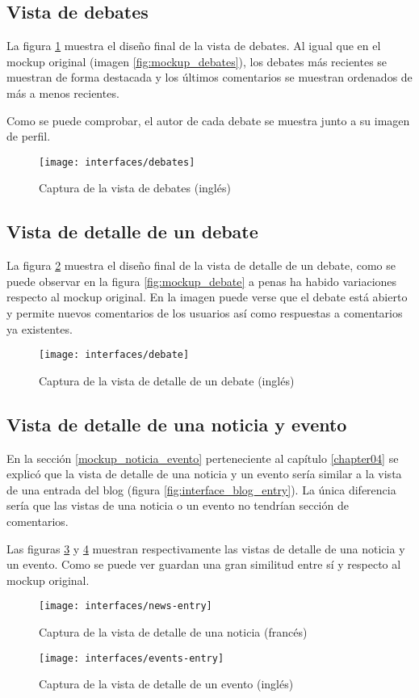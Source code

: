 \subsection{Vista de debates}
La figura \ref{fig:interface_debates} muestra el diseño final de la vista de debates. Al igual que en el mockup original (imagen \ref{fig:mockup_debates}), los debates más recientes se muestran de forma destacada y los últimos comentarios se muestran ordenados de más a menos recientes.

Como se puede comprobar, el autor de cada debate se muestra junto a su imagen de perfil.
\begin{figure}[h]
	\centering
	\texttt{[image: interfaces/debates]}
	\caption{Captura de la vista de debates (inglés)}
	\label{fig:interface_debates}
\end{figure}


\subsection{Vista de detalle de un debate}
La figura \ref{fig:interface_debate} muestra el diseño final de la vista de detalle de un debate,  como se puede observar en la figura \ref{fig:mockup_debate} a penas ha habido variaciones respecto al mockup original.  En la imagen puede verse que el debate está abierto y permite nuevos comentarios de los usuarios así como respuestas a comentarios ya existentes.

\begin{figure}[h]
	\centering
	\texttt{[image: interfaces/debate]}
	\caption{Captura de la vista de detalle de un debate (inglés)}
	\label{fig:interface_debate}
\end{figure}


\subsection{Vista de detalle de una noticia y evento}
En la sección \ref{mockup_noticia_evento} perteneciente al capítulo \ref{chapter04} se explicó que la vista de detalle de una noticia y un evento sería similar a la vista de una entrada del blog (figura \ref{fig:interface_blog_entry}).  La única diferencia sería que las vistas de una noticia o un evento no tendrían sección de comentarios.

Las figuras \ref{fig:interface_noticia} y \ref{fig:interface_evento} muestran respectivamente las vistas de detalle de una noticia y un evento.  Como se puede ver guardan una gran similitud entre sí y respecto al mockup original. 
\begin{figure}[h]
	\centering
	\texttt{[image: interfaces/news-entry]}
	\caption{Captura de la vista de detalle de una noticia (francés)}
	\label{fig:interface_noticia}
\end{figure}
\begin{figure}[h]
	\centering
	\texttt{[image: interfaces/events-entry]}
	\caption{Captura de la vista de detalle de un evento (inglés)}
	\label{fig:interface_evento}
\end{figure}


